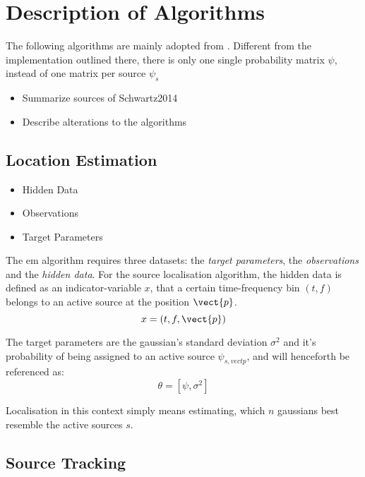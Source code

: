 \chapter{Description of Algorithms}
\label{chap:algorithms}
The following algorithms are mainly adopted from \cite{Schwartz2014}. Different from the implementation outlined there, there is only one single probability matrix $\psi$, instead of one matrix per source $\psi_{s}$
\begin{itemize}
	\item Summarize sources of Schwartz2014
	\item Describe alterations to the algorithms
\end{itemize}

\section{Location Estimation}
\label{sec:algLocEst}
\begin{itemize}
	\item Hidden Data
	\item Observations
	\item Target Parameters
\end{itemize}

The \gls{em} algorithm requires three datasets: the \emph{target parameters}, the \emph{observations} and the \emph{hidden data}. For the source localisation algorithm, the hidden data is defined as an indicator-variable $x$, that a certain time-frequency bin $(t,f)$ belongs to an active source at the position $\vect{p}$. 
\begin{equation}
	x=(t,f,\vect{p})
\end{equation}

The target parameters are the gaussian's standard deviation $\sigma^2$ and it's probability of being assigned to an active source $\psi_{s,vect{p}}$, and will henceforth be referenced as:
\begin{equation}
	\theta=[\psi, \sigma^2]
\end{equation}

Localisation in this context simply means estimating, which $n$ gaussians best resemble the active sources $s$.

\section{Source Tracking}
\label{sec:algSrcTrack}


